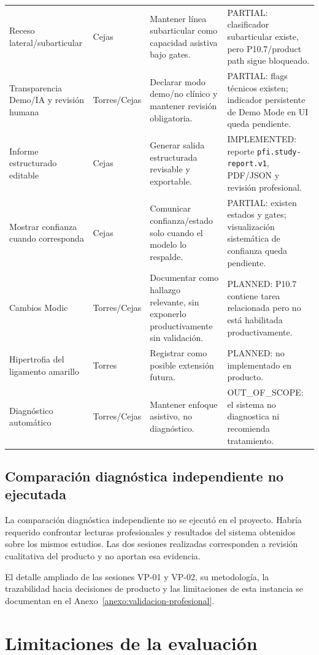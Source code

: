 {\begin{longtable}{>{\raggedright\arraybackslash}p{} >{\raggedright\arraybackslash}p{} >{\raggedright\arraybackslash}p{} >{\raggedright\arraybackslash}p{}}
Receso lateral/subarticular & Cejas & Mantener línea subarticular como capacidad asistiva bajo gates. & PARTIAL: clasificador subarticular existe, pero P10.7/product path sigue bloqueado. \\
Transparencia Demo/IA y revisión humana & Torres/Cejas & Declarar modo demo/no clínico y mantener revisión obligatoria. & PARTIAL: flags técnicos existen; indicador persistente de Demo Mode en UI queda pendiente. \\
Informe estructurado editable & Cejas & Generar salida estructurada revisable y exportable. & IMPLEMENTED: reporte \texttt{pfi.study-report.v1}, PDF/JSON y revisión profesional. \\
Mostrar confianza cuando corresponda & Cejas & Comunicar confianza/estado solo cuando el modelo lo respalde. & PARTIAL: existen estados y gates; visualización sistemática de confianza queda pendiente. \\
Cambios Modic & Torres/Cejas & Documentar como hallazgo relevante, sin exponerlo productivamente sin validación. & PLANNED: P10.7 contiene tarea relacionada pero no está habilitada productivamente. \\
Hipertrofia del ligamento amarillo & Torres & Registrar como posible extensión futura. & PLANNED: no implementado en producto. \\
Diagnóstico automático & Torres/Cejas & Mantener enfoque asistivo, no diagnóstico. & OUT\_OF\_SCOPE: el sistema no diagnostica ni recomienda tratamiento. \\\hline
\end{longtable}
}

\subsection{Comparación diagnóstica independiente no ejecutada}
\label{sec:resultados-validacion-cruzada-no-ejecutada}

La comparación diagnóstica independiente no se ejecutó en el proyecto. Habría requerido confrontar lecturas profesionales y resultados del sistema obtenidos sobre los mismos estudios. Las dos sesiones realizadas corresponden a revisión cualitativa del producto y no aportan esa evidencia.

El detalle ampliado de las sesiones VP-01 y VP-02, su metodología, la trazabilidad hacia decisiones de producto y las limitaciones de esta instancia se documentan en el Anexo~\ref{anexo:validacion-profesional}.

\section{Limitaciones de la evaluación}
\label{sec:resultados-limitaciones}

